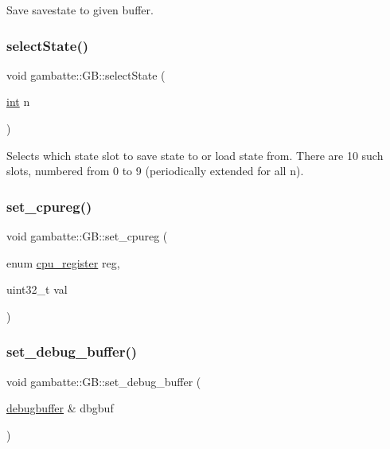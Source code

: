 Save savestate to given buffer. \mbox{\label{classgambatte_1_1GB_a231371a6ef7aa0001afa45d645052569}} 
\subsubsection{\texorpdfstring{select\+State()}{selectState()}}
{\footnotesize\ttfamily void gambatte\+::\+G\+B\+::select\+State (\begin{DoxyParamCaption}\item[{\hyperlink{ioapi_8h_a787fa3cf048117ba7123753c1e74fcd6}{int}}]{n }\end{DoxyParamCaption})}

Selects which state slot to save state to or load state from. There are 10 such slots, numbered from 0 to 9 (periodically extended for all n). \mbox{\label{classgambatte_1_1GB_a4c4ac99f71f96e9c8a0ae7b5ad1a2245}} 
\subsubsection{\texorpdfstring{set\+\_\+cpureg()}{set\_cpureg()}}
{\footnotesize\ttfamily void gambatte\+::\+G\+B\+::set\+\_\+cpureg (\begin{DoxyParamCaption}\item[{enum \hyperlink{classgambatte_1_1GB_afbfe723d7a5e73582401f77c75d13893}{cpu\+\_\+register}}]{reg,  }\item[{uint32\+\_\+t}]{val }\end{DoxyParamCaption})}

\mbox{\label{classgambatte_1_1GB_a87d311a79eef1d8a812cbd8ba82f0715}} 
\subsubsection{\texorpdfstring{set\+\_\+debug\+\_\+buffer()}{set\_debug\_buffer()}}
{\footnotesize\ttfamily void gambatte\+::\+G\+B\+::set\+\_\+debug\+\_\+buffer (\begin{DoxyParamCaption}\item[{\hyperlink{structgambatte_1_1debugbuffer}{debugbuffer} \&}]{dbgbuf }\end{DoxyParamCaption})}

